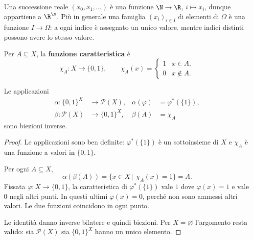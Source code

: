 Una successione reale $(x_0,x_1,\ldots)$ è una funzione $\N\to\R$, $i\mapsto x_i$, dunque appartiene a $\R^\N$. Più in generale una famiglia $(x_i)_{i\in I}$ di elementi di $\Omega$ è una funzione $I\to\Omega$: a ogni indice è assegnato un unico valore, mentre indici distinti possono avere lo stesso valore.

\begin{definizione}
Per $A\subseteq X$, la \textbf{funzione caratteristica} è
\[
\chi_A:X\to\{0,1\},\qquad \chi_A(x)=\begin{cases}1&x\in A,\\0&x\notin A.\end{cases}
\]
\end{definizione}

\begin{teorema}\label{teo:caratteristiche}
Le applicazioni
\[
\begin{aligned}
\alpha:\{0,1\}^X&\to\mathcal P(X),&\alpha(\varphi)&=\varphi^*(\{1\}),\\
\beta:\mathcal P(X)&\to\{0,1\}^X,&\beta(A)&=\chi_A
\end{aligned}
\]
sono biezioni inverse.
\end{teorema}
\begin{proof}
Le applicazioni sono ben definite: $\varphi^*(\{1\})$ è un sottoinsieme di $X$ e $\chi_A$ è una funzione a valori in $\{0,1\}$.

 Per ogni $A\subseteq X$,
\[
\alpha(\beta(A))=\{x\in X\mid\chi_A(x)=1\}=A.
\]
 Fissata $\varphi:X\to\{0,1\}$, la caratteristica di $\varphi^*(\{1\})$ vale $1$ dove $\varphi(x)=1$ e vale $0$ negli altri punti. In questi ultimi $\varphi(x)=0$, perché non sono ammessi altri valori. Le due funzioni coincidono in ogni punto.

Le identità danno inverse bilatere e quindi biezioni. Per $X=\varnothing$ l'argomento resta valido: sia $\mathcal P(X)$ sia $\{0,1\}^X$ hanno un unico elemento.
\end{proof}
